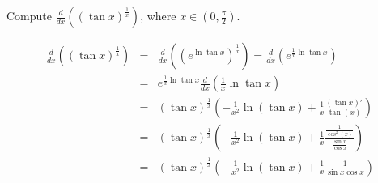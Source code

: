 \begin{example}
Compute $\frac{d}{dx} \left((\tan x)^{\frac{1}{x}} \right)$,  where $x\in (0,\frac{\pi}{2})$.

\[
\begin{array}{rcl}
\displaystyle \frac{d}{dx} \left((\tan x)^{\frac{1}{x}} \right)&=&\displaystyle \frac{d}{dx} \left((e^{\ln \tan x })^{\frac{1}{x}} \right)=\frac{d}{dx} \left(e^{\frac{1}{x}\ln \tan x} \right)\\
&=&\displaystyle  e^{\frac{1}{x} \ln \tan x} \frac{d}{dx}\left(\frac{1}{x} \ln \tan x \right) \\
&=&\displaystyle  (\tan x)^{\frac{1}{x}} \left( -\frac{1}{x^2} \ln (\tan x) +\frac{1}{x} \frac{(\tan x)'}{\tan (x)}\right)\\
&=&\displaystyle (\tan x)^{\frac{1}{x}} \left( -\frac{1}{x^2} \ln (\tan x) +\frac{1}{x} \frac{\frac{1}{\cos^2(x)}}{\frac{\sin x}{\cos x}}\right)\\
&=&\displaystyle (\tan x)^{\frac{1}{x}} \left( -\frac{1}{x^2} \ln (\tan x) +\frac{1}{x} \frac{1}{\sin x \cos x}\right)

\end{array}
\]
\end{example}